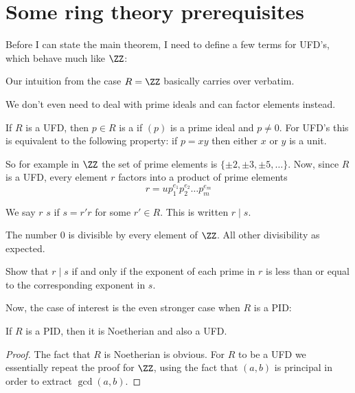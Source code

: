 \section{Some ring theory prerequisites}
Before I can state the main theorem, I need to define a few terms for UFD's,
which behave much like $\ZZ$:
\begin{moral}
	Our intuition from the case $R = \ZZ$ basically carries over verbatim.
\end{moral}
We don't even need to deal with prime ideals and can factor elements instead.

\begin{definition}
	If $R$ is a UFD, then $p \in R$ is a 
	if $(p)$ is a prime ideal and $p \neq 0$.
	For UFD's this is equivalent to the following property:
	if $p = xy$ then either $x$ or $y$ is a unit.
\end{definition}
So for example in $\ZZ$ the set of prime elements is $\{\pm2, \pm3, \pm5, \dots\}$.
Now, since $R$ is a UFD, every element $r$ factors into a product of prime elements
\[ r = u p_1^{e_1} p_2^{e_2} \dots p_m^{e_m} \]

\begin{definition}
	We say $r$  $s$ if $s = r'r$ for some $r' \in R$. This is written $r \mid s$.
\end{definition}
\begin{example}
	[Divisibility in $\ZZ$]
	The number $0$ is divisible by every element of $\ZZ$.
	All other divisibility as expected.
\end{example}
\begin{ques}
	Show that $r \mid s$ if and only if the exponent of each prime in $r$ is
	less than or equal to the corresponding exponent in $s$.
\end{ques}

Now, the case of interest is the even stronger case when $R$ is a PID:
\begin{proposition}
	If $R$ is a PID, then it is Noetherian and also a UFD.
\end{proposition}
\begin{proof}
	The fact that $R$ is Noetherian is obvious.
	For $R$ to be a UFD we essentially repeat the proof for $\ZZ$,
	using the fact that $(a,b)$ is principal in order to extract
	$\gcd(a,b)$.
\end{proof}


